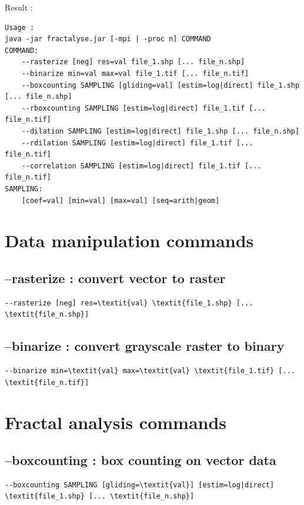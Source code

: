\documentclass[a4paper,10pt]{report}
\begin{document}
Result :
\begin{Verbatim}
Usage :
java -jar fractalyse.jar [-mpi | -proc n] COMMAND
COMMAND:
	--rasterize [neg] res=val file_1.shp [... file_n.shp]
	--binarize min=val max=val file_1.tif [... file_n.tif]
	--boxcounting SAMPLING [gliding=val] [estim=log|direct] file_1.shp [... file_n.shp]
	--rboxcounting SAMPLING [estim=log|direct] file_1.tif [... file_n.tif]
	--dilation SAMPLING [estim=log|direct] file_1.shp [... file_n.shp]
	--rdilation SAMPLING [estim=log|direct] file_1.tif [... file_n.tif]
	--correlation SAMPLING [estim=log|direct] file_1.tif [... file_n.tif]
SAMPLING: 
	[coef=val] [min=val] [max=val] [seq=arith|geom]
\end{Verbatim}

\section{Data manipulation commands}
\subsection{--rasterize : convert vector to raster}
\begin{Verbatim}[commandchars=\\\{\}]
--rasterize [neg] res=\textit{val} \textit{file_1.shp} [... \textit{file_n.shp}]
\end{Verbatim}

\subsection{--binarize : convert grayscale raster to binary}
\begin{Verbatim}[commandchars=\\\{\}]
--binarize min=\textit{val} max=\textit{val} \textit{file_1.tif} [... \textit{file_n.tif}]
\end{Verbatim}

\section{Fractal analysis commands}

\subsection{--boxcounting : box counting on vector data}
\begin{Verbatim}[commandchars=\\\{\}]
--boxcounting SAMPLING [gliding=\textit{val}] [estim=log|direct] \textit{file_1.shp} [... \textit{file_n.shp}]
\end{Verbatim}
\end{document}
